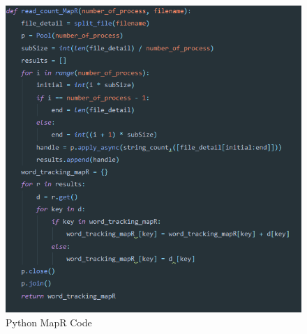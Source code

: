 \documentclass[12pt]{article}
\begin{document}
\begin{itemize}
\begin{figure}[H]
    	\includegraphics[width=13cm]{MapR_code.png}
    	\caption{Python MapR Code} 
    	\label{fig:2}
  	
    \end{figure}
\end{itemize}
\end{document}
